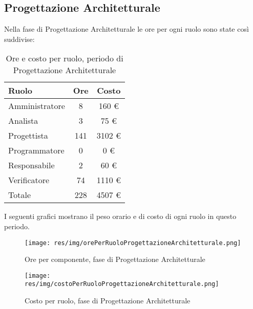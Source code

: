 \subsection{Progettazione Architetturale}
Nella fase di Progettazione Architetturale le ore per ogni ruolo sono state cos\`i suddivise:

\begin{table}[H]
	\centering
	\begin{tabular}{ l c c }
		\textbf{Ruolo} & \textbf{Ore} & \textbf{Costo} \\
		\hline
		Amministratore & 8 & 160 \euro \\
		Analista & 3 & 75 \euro \\
		Progettista & 141 & 3102 \euro \\
		Programmatore & 0 & 0 \euro \\
		Responsabile & 2 & 60 \euro \\
		Verificatore & 74 & 1110 \euro \\
		\hline
		Totale & 228 & 4507 \euro \\
		\hline
	\end{tabular}
	\caption{Ore e costo per ruolo, periodo di Progettazione Architetturale}
\end{table}

I seguenti grafici mostrano il peso orario e di costo di ogni ruolo in questo periodo.

\begin{figure}[H]
  \begin{center}
    \texttt{[image: res/img/orePerRuoloProgettazioneArchitetturale.png]}
  \caption{Ore per componente, fase di Progettazione Architetturale}
  \end{center} 
\end{figure}  

\begin{figure}[H]
  \begin{center}
    \texttt{[image: res/img/costoPerRuoloProgettazioneArchitetturale.png]}
  \caption{Costo per ruolo, fase di Progettazione Architetturale}
  \end{center} 
\end{figure}  


